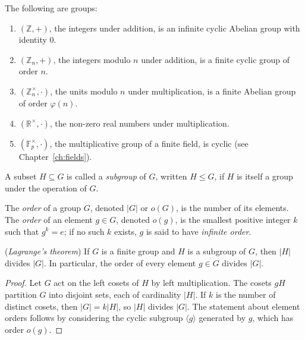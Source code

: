 \documentclass[a4paper, 12pt]{book} %
\begin{document}
\begin{example}
    The following are groups:
    \begin{enumerate}
        \item $(\mathbb{Z}, +)$, the integers under addition, is an infinite cyclic Abelian group with identity $0$.
        \item $(\mathbb{Z}_n, +)$, the integers modulo $n$ under addition, is a finite cyclic group of order $n$.
        \item $(\mathbb{Z}_n^\times, \cdot)$, the units modulo $n$ under multiplication, is a finite Abelian group of order $\varphi(n)$.
        \item $(\mathbb{R}^\times, \cdot)$, the non-zero real numbers under multiplication.
        \item $(\mathbb{F}_p^\times, \cdot)$, the multiplicative group of a finite field, is cyclic (see Chapter~\ref{ch:fields}).
    \end{enumerate}
\end{example}

\begin{definition}
    A subset $H \subseteq G$ is called a \emph{subgroup} of $G$, written $H \leq G$, if $H$ is itself a group under the operation of $G$.
\end{definition}

\begin{definition}
    The \emph{order} of a group $G$, denoted $|G|$ or $o(G)$, is the number of its elements. The \emph{order} of an element $g \in G$, denoted $o(g)$, is the smallest positive integer $k$ such that $g^k = e$; if no such $k$ exists, $g$ is said to have \emph{infinite order}.
\end{definition}

\begin{theorem}
    (\emph{Lagrange's theorem}) If $G$ is a finite group and $H$ is a subgroup of $G$, then $|H|$ divides $|G|$. In particular, the order of every element $g \in G$ divides $|G|$.
\end{theorem}

\begin{proof}
    Let $G$ act on the left cosets of $H$ by left multiplication. The cosets $gH$ partition $G$ into disjoint sets, each of cardinality $|H|$. If $k$ is the number of distinct cosets, then $|G| = k |H|$, so $|H|$ divides $|G|$. The statement about element orders follows by considering the cyclic subgroup $\langle g \rangle$ generated by $g$, which has order $o(g)$.
\end{proof}
\end{document}
